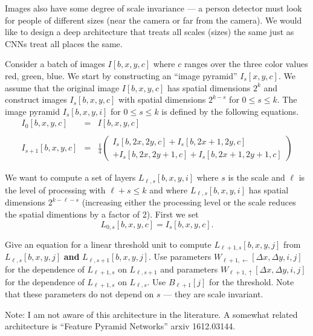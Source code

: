 \documentclass{article}
\newcommand{\solution}[1]{}
\begin{document}
\medskip
Images also have some degree of scale invariance --- a person detector must look for people of different sizes
(near the camera or far from the camera).  We would like to design a deep architecture that treats all scales (sizes) the same just as CNNs
treat all places the same.

\medskip
Consider a batch of images
$I[b,x,y,c]$ where $c$ ranges over the three color values red, green, blue. We start by constructing an ``image pyramid'' $I_s[x,y,c]$.
We assume that the original image $I[b,x,y,c]$ has spatial dimensions $2^k$ and construct images $I_s[b,x,y,c]$ with spatial dimensions $2^{k-s}$
for $0 \leq s \leq k$.  The image pyramid $I_s[b,x,y,i]$ for $0 \leq s \leq k$ is defined by the following equations.
\begin{eqnarray*}
  I_0[b,x,y,c] & = & I[b,x,y,c] \\
  \\
  I_{s+1}[b,x,y,c] & = & \frac{1}{4}\left(\begin{array}{l} I_s[b,2x,2y,c] + I_s[b,2x+1,2y,c] \\ + I_s[b,2x,2y+1,c] + I_s[b,2x+1,2y+1,c]\end{array}\right)
\end{eqnarray*}

We want to compute a set of layers $L_{\ell,s}[b,x,y,i]$ where $s$ is the scale and $\ell$ is the level of processing with $\ell + s \leq k$ and where
$L_{\ell,s}[b,x,y,i]$ has spatial dimensions $2^{k-\ell-s}$ (increasing either the processing level or the scale reduces the spatial dimentions by a factor of 2).
First we set
$$L_{0,s}[b,x,y,c] = I_s[b,x,y,c].$$

\medskip
Give an equation for a linear threshold unit to compute $L_{\ell+1,s}[b,x,y,j]$ from $L_{\ell,s}[b,x,y,j]$ {\bf and} $L_{\ell,s+1}[b,x,y,j]$. Use parameters
$W_{\ell+1,\leftarrow}[\Delta x, \Delta y, i,j]$ for the dependence of $L_{\ell+1,s}$ on $L_{\ell,s+1}$ and
parameters
$W_{\ell+1,\uparrow}[\Delta x, \Delta y, i,j]$ for the dependence of $L_{\ell+1,s}$ on $L_{\ell,s}$.  Use $B_{\ell+1}[j]$ for the threshold.
Note that these parameters do not depend on $s$ --- they are scale invariant.

\solution{
  $$L_{\ell+1,s}[b,x,y,j] = \sigma\left(\begin{array}{ll}
      & \sum_{\Delta x,\Delta y,i} W_{\ell+1,\leftarrow}[\Delta x, \Delta y, i,j]L_{\ell,s+1}[b,x+\Delta x,y+\Delta y,i,j] \\
    + & \sum_{\Delta x,\Delta y,i} W_{\ell+1,\uparrow}\;[\Delta x, \Delta y, i,j]\;L_{\ell,s}\;[b,2x+\Delta x,2y+\Delta y,i,j] \\
    + & B_{\ell+1}[j] \end{array}\right)$$
}

Note: I am not aware of this architecture in the literature.  A somewhat related architecture is ``Feature Pyramid Networks'' arxiv 1612.03144.
\end{document}
